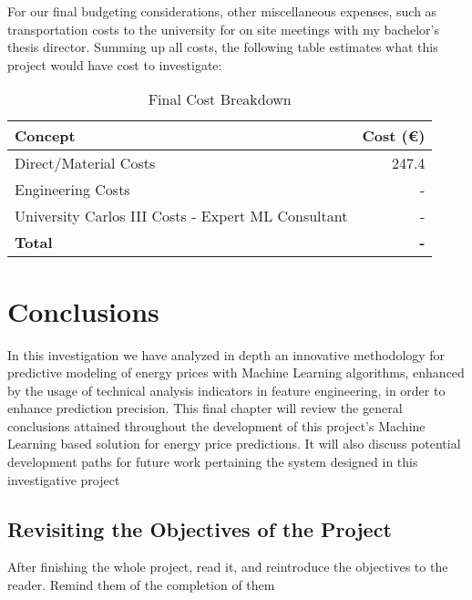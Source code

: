 \documentclass[12pt]{report} %
\begin{document}
For our final budgeting considerations, other miscellaneous expenses, such as transportation costs to the university for on site meetings with my bachelor's thesis director. Summing up all costs, the following table estimates what this project would have cost to investigate:

\begin{table}[H]
    \caption{Final Cost Breakdown}
    \centering
    \begin{tabular}{|l|r|}
        \hline
        \textbf{Concept} & \textbf{Cost (€)} \\
        \hline
        Direct/Material Costs & 247.4 \\
        Engineering Costs & - \\
        University Carlos III Costs - Expert ML Consultant & - \\
        \hline
        \textbf{Total} & \textbf{-} \\
        \hline
    \end{tabular}
\end{table}



\chapter{Conclusions}
In this investigation we have analyzed in depth an innovative methodology for predictive modeling of energy prices with Machine Learning algorithms, enhanced by the usage of technical analysis indicators in feature engineering, in order to enhance prediction precision. This final chapter will review the general conclusions attained throughout the development of this project's Machine Learning based solution for energy price predictions. It will also discuss potential development paths for future work pertaining the system designed in this investigative project



\section{Revisiting the Objectives of the Project}
After finishing the whole project, read it, and reintroduce the objectives to the reader. Remind them of the completion of them
\end{document}

